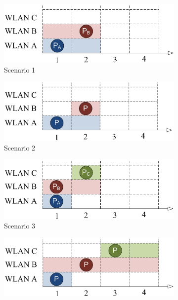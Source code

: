 \documentclass[a4paper]{article}
\begin{document}
\begin{figure}[h]
\centering
  \begin{subfigure}[b]{0.475\textwidth}
    \centering
    \includegraphics[width=\textwidth]{img/channel_bonding_scenario1.png}
    \caption[]%
    {{\small Scenario 1}}    
    \label{fig:channel_bonding_scenario1}
  \end{subfigure}
  \hfill
  \begin{subfigure}[b]{0.475\textwidth}  
    \centering 
    \includegraphics[width=\textwidth]{img/channel_bonding_scenario2.png}
    \caption[]%
    {{\small Scenario 2}}
    \label{fig:channel_bonding_scenario2}
  \end{subfigure}
    \begin{subfigure}[b]{0.475\textwidth}
    \centering
    \includegraphics[width=\textwidth]{img/channel_bonding_scenario3.png}
    \caption[]%
    {{\small Scenario 3}}    
    \label{fig:channel_bonding_scenario3}
  \end{subfigure}
  \hfill
  \begin{subfigure}[b]{0.475\textwidth}  
    \centering 
    \includegraphics[width=\textwidth]{img/channel_bonding_scenario4.png}

\end{subfigure}
\end{figure}
\end{document}
